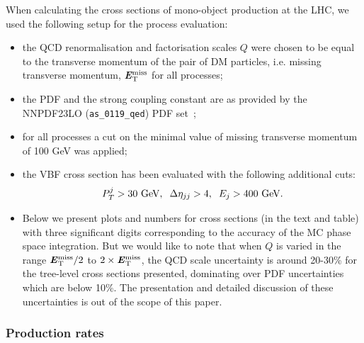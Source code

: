 \documentclass[12pt,a4paper]{article}
\newcommand {\blue} {\color{blue}}
\newcommand{\MET}{\textbf{\textit{E}$_{\rm T}^{\rm miss}$}}
\begin{document}
{\blue When calculating the cross sections of mono-object production at the LHC,
we used the following setup for the process evaluation:}
\begin{itemize}
\item the QCD renormalisation and factorisation scales $Q$ were chosen to be equal to the
transverse momentum of the pair of DM particles,  i.e. missing transverse momentum, \MET{}
for all processes;
\item the PDF and the strong coupling constant are as provided by the
NNPDF23LO (\verb|as_0119_qed|) PDF set~\cite{Ball:2012cx};
\item for all processes a cut on the minimal value of missing transverse momentum of 100 GeV 
was applied;
\item the VBF cross section has been evaluated with the following additional cuts:
  \begin{align}
    P_T^j>30\mbox{ GeV}, \hspace{2mm} \Delta\eta_{jj}>4, \hspace{2mm} E_j> 400\mbox{ GeV}.
  \end{align}
\item Below we present plots and numbers for cross sections (in the text and table)
with three significant digits corresponding to the accuracy of the MC phase space integration.
But we would like to note that when $Q$ is varied in the range $\MET/2$ to $2\times \MET$,
the QCD scale uncertainty is around 20-30\% for the tree-level cross sections presented,
dominating over PDF uncertainties which are below 10\%.
The presentation and detailed discussion of
these uncertainties is out of the scope of this paper.
\end{itemize}

\subsubsection{Production rates}
\end{document}
